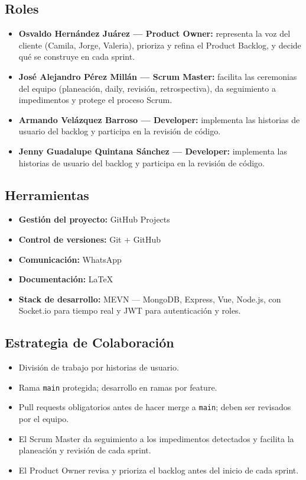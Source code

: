 \documentclass[12pt, a4paper]{article}
\begin{document}
\subsection{Roles}
\begin{itemize}[leftmargin=*]
    \item \textbf{Osvaldo Hernández Juárez --- Product Owner:} representa la voz del cliente (Camila, Jorge, Valeria), prioriza y refina el Product Backlog, y decide qué se construye en cada sprint.
    \item \textbf{José Alejandro Pérez Millán --- Scrum Master:} facilita las ceremonias del equipo (planeación, daily, revisión, retrospectiva), da seguimiento a impedimentos y protege el proceso Scrum.
    \item \textbf{Armando Velázquez Barroso --- Developer:} implementa las historias de usuario del backlog y participa en la revisión de código.
    \item \textbf{Jenny Guadalupe Quintana Sánchez --- Developer:} implementa las historias de usuario del backlog y participa en la revisión de código.
\end{itemize}

\subsection{Herramientas}
\begin{itemize}[leftmargin=*]
    \item \textbf{Gestión del proyecto:} GitHub Projects
    \item \textbf{Control de versiones:} Git + GitHub
    \item \textbf{Comunicación:} WhatsApp
    \item \textbf{Documentación:} LaTeX
    \item \textbf{Stack de desarrollo:} MEVN --- MongoDB, Express, Vue, Node.js, con Socket.io para tiempo real y JWT para autenticación y roles.
\end{itemize}

\subsection{Estrategia de Colaboración}
\begin{itemize}[leftmargin=*]
    \item División de trabajo por historias de usuario.
    \item Rama \texttt{main} protegida; desarrollo en ramas por feature.
    \item Pull requests obligatorios antes de hacer merge a \texttt{main}; deben ser revisados por el equipo.
    \item El Scrum Master da seguimiento a los impedimentos detectados y facilita la planeación y revisión de cada sprint.
    \item El Product Owner revisa y prioriza el backlog antes del inicio de cada sprint.
\end{itemize}
\end{document}
